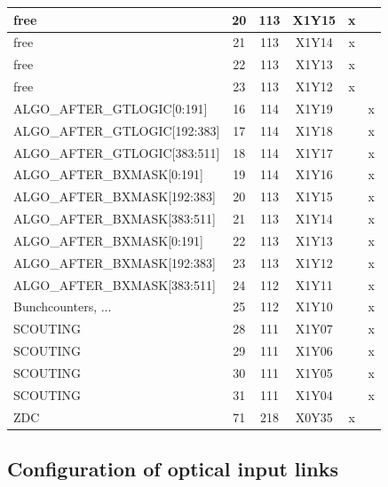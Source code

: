 \begin{longtable}{|l|c|c|c|c|c|}
free & 20  & 113 & X1Y15 & x &   \\\hline
free & 21  & 113 & X1Y14 & x &   \\\hline
free & 22  & 113 & X1Y13 & x &   \\\hline
free & 23  & 113 & X1Y12 & x &   \\\hline\hline
ALGO\_AFTER\_GTLOGIC[0:191] & 16  & 114 & X1Y19 &   & x \\\hline
ALGO\_AFTER\_GTLOGIC[192:383] & 17  & 114 & X1Y18 &   & x \\\hline
ALGO\_AFTER\_GTLOGIC[383:511] & 18  & 114 & X1Y17 &   & x \\\hline
ALGO\_AFTER\_BXMASK[0:191] & 19  & 114 & X1Y16 &   & x \\\hline
ALGO\_AFTER\_BXMASK[192:383] & 20  & 113 & X1Y15 &   & x \\\hline
ALGO\_AFTER\_BXMASK[383:511] & 21  & 113 & X1Y14 &   & x \\\hline
ALGO\_AFTER\_BXMASK[0:191] & 22  & 113 & X1Y13 &   & x \\\hline
ALGO\_AFTER\_BXMASK[192:383] & 23  & 113 & X1Y12 &   & x \\\hline
ALGO\_AFTER\_BXMASK[383:511] & 24  & 112 & X1Y11 &   & x \\\hline
Bunchcounters, ... & 25  & 112 & X1Y10 &   & x \\\hline
SCOUTING & 28  & 111 & X1Y07 &   & x \\\hline
SCOUTING & 29  & 111 & X1Y06 &   & x \\\hline
SCOUTING & 30  & 111 & X1Y05 &   & x \\\hline
SCOUTING & 31  & 111 & X1Y04 &   & x \\\hline\hline
ZDC & 71  & 218 & X0Y35 & x & \\\hline
\end{longtable}

\clearpage

\subsection{Configuration of optical input links}\label{sec:app:app_b}

% 
% 

